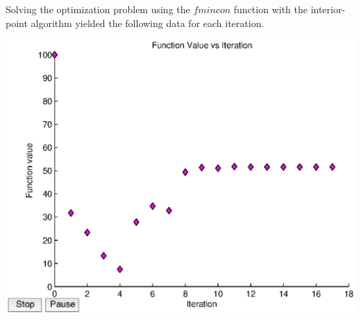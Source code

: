 \documentclass[11pt]{article}
\begin{document}

\begin{problem}{1}
\end{problem}
\begin{solution}

\end{solution}
Solving the optimization problem using the $fmincon$ function with the interior-point algorithm yielded the following data for each iteration.

\begin{center}
\includegraphics[scale=0.75]{problem1/problem1.eps}
\end{center}
\end{document}
